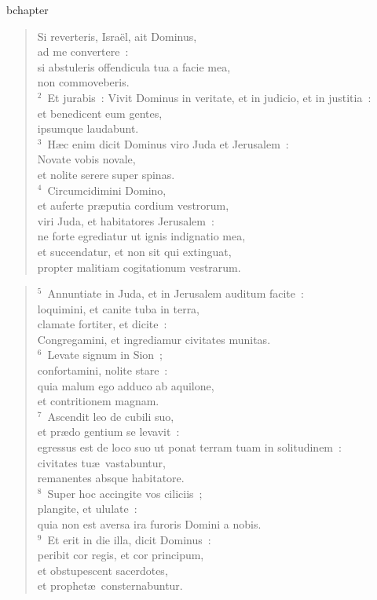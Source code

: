 bchapter\begin{flushleft}\begin{verse}\vspace{-19pt}Si reverteris, Isra\"el, ait Dominus,\\ ad me convertere~:\\ si abstuleris offendicula tua a facie mea,\\ non commoveberis.\\
${}^{2}$~Et jurabis~: Vivit Dominus in veritate, et in judicio, et in justitia~:\\ et benedicent eum gentes,\\ ipsumque laudabunt.\\
${}^{3}$~H\ae c enim dicit Dominus viro Juda et Jerusalem~:\\ Novate vobis novale,\\ et nolite serere super spinas.\\
${}^{4}$~Circumcidimini Domino,\\ et auferte pr\ae putia cordium vestrorum,\\ viri Juda, et habitatores Jerusalem~:\\ ne forte egrediatur ut ignis indignatio mea,\\ et succendatur, et non sit qui extinguat,\\ propter malitiam cogitationum vestrarum.\end{verse}\end{flushleft}


\begin{flushleft}\begin{verse}${}^{5}$~Annuntiate in Juda, et in Jerusalem auditum facite~:\\ loquimini, et canite tuba in terra,\\ clamate fortiter, et dicite~:\\ Congregamini, et ingrediamur civitates munitas.\\
${}^{6}$~Levate signum in Sion~;\\ confortamini, nolite stare~:\\ quia malum ego adduco ab aquilone,\\ et contritionem magnam.\\
${}^{7}$~Ascendit leo de cubili suo,\\ et pr\ae do gentium se levavit~:\\ egressus est de loco suo ut ponat terram tuam in solitudinem~:\\ civitates tu\ae\ vastabuntur,\\ remanentes absque habitatore.\\
${}^{8}$~Super hoc accingite vos ciliciis~;\\ plangite, et ululate~:\\ quia non est aversa ira furoris Domini a nobis.\\
${}^{9}$~Et erit in die illa, dicit Dominus~:\\ peribit cor regis, et cor principum,\\ et obstupescent sacerdotes,\\ et prophet\ae\ consternabuntur.\end{verse}\end{flushleft}


